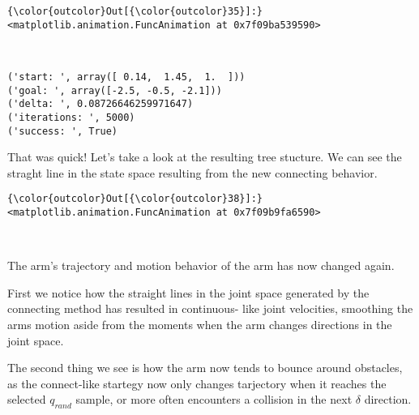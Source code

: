 \documentclass{article}
\begin{document}
            \begin{Verbatim}[commandchars=\\\{\}]
{\color{outcolor}Out[{\color{outcolor}35}]:} <matplotlib.animation.FuncAnimation at 0x7f09ba539590>
\end{Verbatim}
        
    \begin{center}
    \end{center}
    { \hspace*{\fill} \\}
    

    \begin{Verbatim}[commandchars=\\\{\}]
('start: ', array([ 0.14,  1.45,  1.  ]))
('goal: ', array([-2.5, -0.5, -2.1]))
('delta: ', 0.08726646259971647)
('iterations: ', 5000)
('success: ', True)
    \end{Verbatim}

    That was quick! Let's take a look at the resulting tree stucture. We can
see the straght line in the state space resulting from the new
connecting behavior.



            \begin{Verbatim}[commandchars=\\\{\}]
{\color{outcolor}Out[{\color{outcolor}38}]:} <matplotlib.animation.FuncAnimation at 0x7f09b9fa6590>
\end{Verbatim}
        
    \begin{center}
    \end{center}
    { \hspace*{\fill} \\}
    
    The arm's trajectory and motion behavior of the arm has now changed
again.

First we notice how the straight lines in the joint space generated by
the connecting method has resulted in continuous- like joint velocities,
smoothing the arms motion aside from the moments when the arm changes
directions in the joint space.

The second thing we see is how the arm now tends to bounce around
obstacles, as the connect-like startegy now only changes tarjectory when
it reaches the selected $q_{rand}$ sample, or more often encounters a
collision in the next $\delta$ direction.
\end{document}
